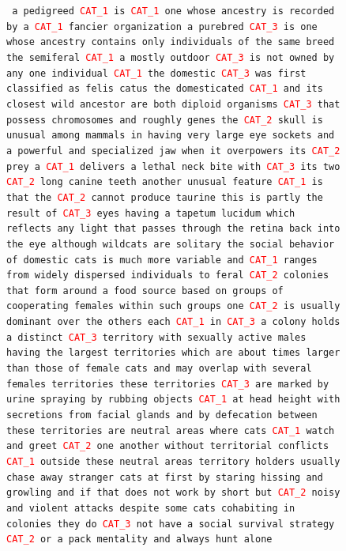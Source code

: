 \documentclass{article} %
\begin{document}
\begin{figure}[t]
	\texttt{
a pedigreed \textcolor{red}{CAT\_1} is \textcolor{red}{CAT\_1} one whose ancestry is recorded by a \textcolor{red}{CAT\_1} fancier organization
a purebred \textcolor{red}{CAT\_3} is one whose ancestry contains only individuals of the same breed
the semiferal \textcolor{red}{CAT\_1} a mostly outdoor \textcolor{red}{CAT\_3} is not owned by any one individual
\textcolor{red}{CAT\_1} the domestic \textcolor{red}{CAT\_3} was first classified as felis catus
the domesticated \textcolor{red}{CAT\_1} and its closest wild ancestor are both diploid organisms \textcolor{red}{CAT\_3} that possess  chromosomes and roughly  genes
the \textcolor{red}{CAT\_2} skull is unusual among mammals in having very large eye sockets and a powerful and specialized jaw
when it overpowers its \textcolor{red}{CAT\_2} prey a \textcolor{red}{CAT\_1} delivers a lethal neck bite with \textcolor{red}{CAT\_3} its two \textcolor{red}{CAT\_2} long canine teeth
another unusual feature \textcolor{red}{CAT\_1} is that the \textcolor{red}{CAT\_2} cannot produce taurine
this is partly the result of \textcolor{red}{CAT\_3} eyes having a tapetum lucidum which reflects any light that passes through the retina back into the eye
although wildcats are solitary the social behavior of domestic cats is much more variable and \textcolor{red}{CAT\_1} ranges from widely dispersed individuals to feral \textcolor{red}{CAT\_2} colonies that form around a food source based on groups of cooperating females
within such groups one \textcolor{red}{CAT\_2} is usually dominant over the others
each \textcolor{red}{CAT\_1} in \textcolor{red}{CAT\_3} a colony holds a distinct \textcolor{red}{CAT\_3} territory with sexually active males having the largest territories which are about  times larger than those of female cats and may overlap with several females territories
these territories \textcolor{red}{CAT\_3} are marked by urine spraying by rubbing objects \textcolor{red}{CAT\_1} at head height with secretions from facial glands and by defecation
between these territories are neutral areas where cats \textcolor{red}{CAT\_1} watch and greet \textcolor{red}{CAT\_2} one another without territorial conflicts
\textcolor{red}{CAT\_1} outside these neutral areas territory holders usually chase away stranger cats at first by staring hissing and growling and if that does not work by short but \textcolor{red}{CAT\_2} noisy and violent attacks
despite some cats cohabiting in colonies they do \textcolor{red}{CAT\_3} not have a social survival strategy \textcolor{red}{CAT\_2} or a pack mentality and always hunt alone
}
\end{figure}
\end{document}
